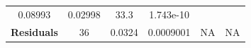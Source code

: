 \documentclass[]{article}
\begin{document}
\begin{longtable}[]{@{}cccccc@{}}
\begin{minipage}[t]{0.10\columnwidth}
0.08993
\strut\end{minipage} &
\begin{minipage}[t]{0.12\columnwidth}\centering\strut
0.02998
\strut\end{minipage} &
\begin{minipage}[t]{0.12\columnwidth}\centering\strut
33.3
\strut\end{minipage} &
\begin{minipage}[t]{0.12\columnwidth}\centering\strut
1.743e-10
\strut\end{minipage}\tabularnewline
\begin{minipage}[t]{0.19\columnwidth}\centering\strut
\textbf{Residuals}
\strut\end{minipage} &
\begin{minipage}[t]{0.06\columnwidth}\centering\strut
36
\strut\end{minipage} &
\begin{minipage}[t]{0.10\columnwidth}\centering\strut
0.0324
\strut\end{minipage} &
\begin{minipage}[t]{0.12\columnwidth}\centering\strut
0.0009001
\strut\end{minipage} &
\begin{minipage}[t]{0.12\columnwidth}\centering\strut
NA
\strut\end{minipage} &
\begin{minipage}[t]{0.12\columnwidth}\centering\strut
NA
\strut\end{minipage}\tabularnewline
\bottomrule
\end{longtable}
\end{document}
